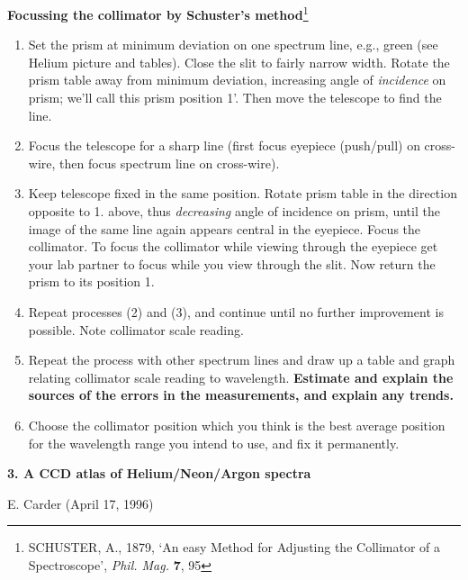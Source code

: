 \documentclass[12pt]{article}
\begin{document}
{\large {\bf Focussing the collimator by Schuster's method}\footnote{SCHUSTER, A., 1879, `An easy Method for Adjusting the Collimator of a Spectroscope',  {\sl Phil. Mag.} {\bf 7}, 95} }

\begin{enumerate}
\item Set the prism at minimum deviation on one spectrum line, e.g., green (see Helium picture and tables).  Close the slit to fairly narrow width. Rotate the prism table away from minimum deviation, increasing angle of {\em incidence} on  prism; we'll call this prism position 1'. Then move the telescope to find the line.

\item Focus the telescope for a sharp line (first focus eyepiece (push/pull) on cross-wire, then  focus spectrum line on cross-wire).

\item Keep telescope fixed in the same position. Rotate prism table in the direction opposite to 1. above, thus {\em decreasing\/} angle of incidence on  prism, until the image of the same line again appears central in the eyepiece.  Focus the collimator.  To focus the collimator while viewing through the eyepiece get your lab partner to focus while you view through the slit. Now return the prism to its position 1. 

\item Repeat processes (2) and (3), and continue until no further improvement is possible.   Note collimator scale reading.

\item Repeat the process with other spectrum lines and draw up a table and graph relating collimator scale reading to wavelength. {\bf Estimate and explain the sources of the errors in the measurements, and explain any trends.}

\item Choose the collimator position which you think is the best average position for the  wavelength range you intend to use, and fix it permanently.
\end{enumerate}

\newpage

\begin{center}
{\large{\bf 3. A CCD atlas of Helium/Neon/Argon spectra}}
\end{center}

\vspace{1cm} 


\centerline{\hspace{-1cm} E. Carder (April 17, 1996)}
\end{document}
